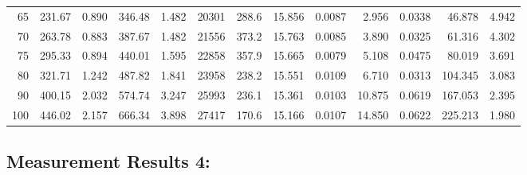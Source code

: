 \documentclass[10pt]{article}
\begin{document}
{\begin{tabular}{|r|rr|rr|rr|rr|rr|r|r|}
       65 &       231.67 &        0.890 &       346.48 &        1.482 &        20301 &        288.6 &       15.856 &       0.0087 &        2.956 &       0.0338 &       46.878 &        4.942 \\
       70 &       263.78 &        0.883 &       387.67 &        1.482 &        21556 &        373.2 &       15.763 &       0.0085 &        3.890 &       0.0325 &       61.316 &        4.302 \\
       75 &       295.33 &        0.894 &       440.01 &        1.595 &        22858 &        357.9 &       15.665 &       0.0079 &        5.108 &       0.0475 &       80.019 &        3.691 \\
       80 &       321.71 &        1.242 &       487.82 &        1.841 &        23958 &        238.2 &       15.551 &       0.0109 &        6.710 &       0.0313 &      104.345 &        3.083 \\
       90 &       400.15 &        2.032 &       574.74 &        3.247 &        25993 &        236.1 &       15.361 &       0.0103 &       10.875 &       0.0619 &      167.053 &        2.395 \\
      100 &       446.02 &        2.157 &       666.34 &        3.898 &        27417 &        170.6 &       15.166 &       0.0107 &       14.850 &       0.0622 &      225.213 &        1.980 \\
\hline
\end{tabular}
}



\subsection*{\large \bf Measurement Results 4:}
\end{document}

